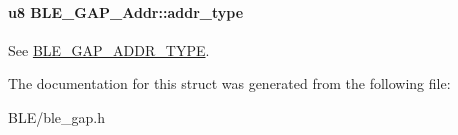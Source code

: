 \paragraph[{\texorpdfstring{addr\+\_\+type}{addr_type}}]{\setlength{\rightskip}{0pt plus 5cm}u8 B\+L\+E\+\_\+\+G\+A\+P\+\_\+\+Addr\+::addr\+\_\+type}\hypertarget{struct_b_l_e___g_a_p___addr_a851bd81d3d495b21b2dea2d4e7efffe8}{}\label{struct_b_l_e___g_a_p___addr_a851bd81d3d495b21b2dea2d4e7efffe8}
See \hyperlink{group___b_l_e___g_a_p___a_d_d_r___t_y_p_e}{B\+L\+E\+\_\+\+G\+A\+P\+\_\+\+A\+D\+D\+R\+\_\+\+T\+Y\+PE}. 

The documentation for this struct was generated from the following file\+:\begin{DoxyCompactItemize}
\item 
B\+L\+E/ble\+\_\+gap.\+h\end{DoxyCompactItemize}
